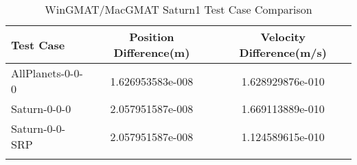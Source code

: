 \begin{table}[htbp!]
\centering
\caption{ WinGMAT/MacGMAT Saturn1 Test Case Comparison}
      \begin{tabular}{lcc}
      \hline\hline
          Test Case & Position Difference(m) & Velocity Difference(m/s) \\
         \hline
         AllPlanets-0-0-0 & 1.626953583e-008 & 1.628929876e-010 \\
         Saturn-0-0-0 & 2.057951587e-008 & 1.669113889e-010 \\
         Saturn-0-0-SRP & 2.057951587e-008 & 1.124589615e-010 \\
      \hline\hline
      \label{Table: Saturn1 WinGMAT-MacGMAT Table} 
\end{tabular}
\end{table}
